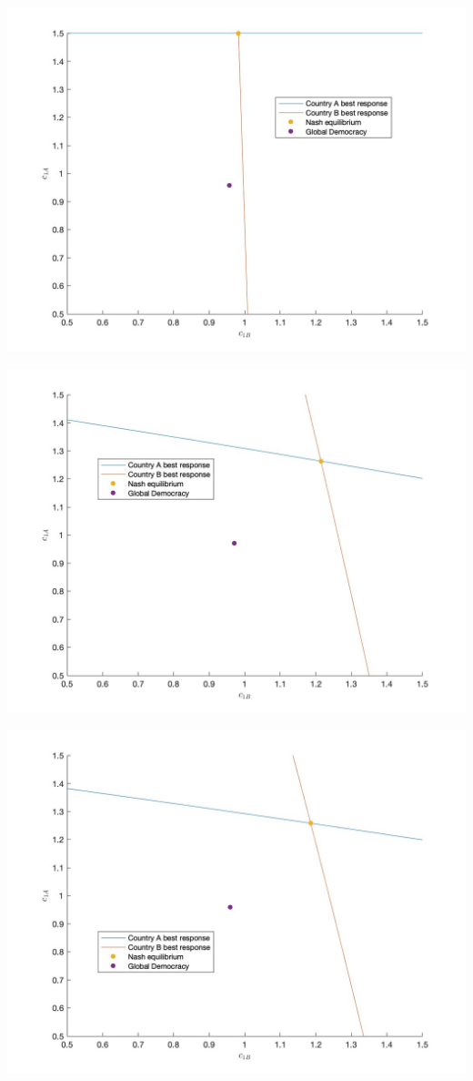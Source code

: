 \documentclass[11pt,preprint, authoryear]{elsarticle}
\let\origfigure\figure
\let\endorigfigure\endfigure
\renewenvironment{figure}[1][2] {
    \expandafter\origfigure\expandafter[H]
} {
    \endorigfigure
}
\numberwithin{equation}{section}
\numberwithin{figure}{section}
\numberwithin{table}{section}
\begin{document}
\newpage

\begin{figure}[H]

{\centering \includegraphics[width=0.5\linewidth]{images/Fig2_0.1Size0Bias} 

}

\caption{Nash equilibrium for assymetric country size model}\label{fig:unnamed-chunk-2}
\end{figure}

\begin{figure}[H]

{\centering \includegraphics[width=0.5\linewidth]{images/Fig2_0.5Size0Bias} 

}

\caption{Nash equilibrium for symmetric country size model}\label{fig:unnamed-chunk-3}
\end{figure}

\begin{figure}[H]

{\centering \includegraphics[width=0.5\linewidth]{images/Fig2_0.5Size0.9Bias} 

}

\caption{Nash equilibrium for assymetric bias model}\label{fig:unnamed-chunk-4}
\end{figure}
\end{document}
